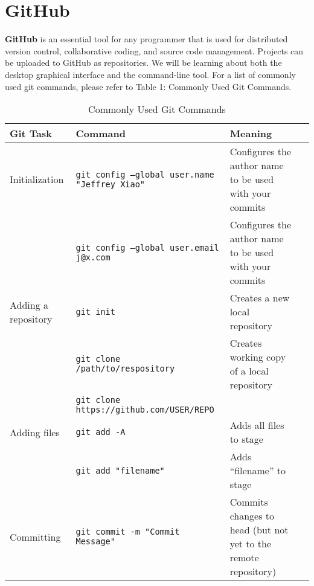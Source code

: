 \documentclass[11pt, letterpaper]{article}
\begin{document}
	\section{GitHub}
		\textbf{GitHub} is an essential tool for any programmer that is used for distributed version control, collaborative coding, and source code management. Projects can be uploaded to GitHub as repositories. We will be learning about both the desktop graphical interface and the command-line tool. For a list of commonly used git commands, please refer to Table 1: Commonly Used Git Commands.

		\begin{table}[!htb]
			\begin{center}
				\vspace*{-2cm}
				\caption{Commonly Used Git Commands}
				\begin{tabular}{p{2cm} l p{4cm} l}
					\toprule
					Git Task & Command & Meaning \\
					\midrule
					Initialization 
					
					& \texttt{git config --global user.name "Jeffrey Xiao"} & Configures the author name to be used with your commits \\\cmidrule{2-3}
									
					& \texttt{git config --global user.email j@x.com} & Configures the author name to be used with your commits \\
					
					\midrule
					Adding a repository
					
					& \texttt{git init} & Creates a new local repository \\\cmidrule{2-3}

					& \texttt{git clone /path/to/respository} & Creates working copy of a local repository \\\cmidrule{2-3}
										
					& \texttt{git clone https://github.com/USER/REPO} \\

					\midrule
					Adding files

					& \texttt{git add -A} & Adds all files to stage \\\cmidrule{2-3}
					
					& \texttt{git add "filename"} & Adds ``filename'' to stage \\

					\midrule
					Committing

					& \texttt{git commit -m "Commit Message"} & Commits changes to head (but not yet to the remote repository) \\\cmidrule{2-3}


\end{tabular}
\end{center}
\end{table}
\end{document}
